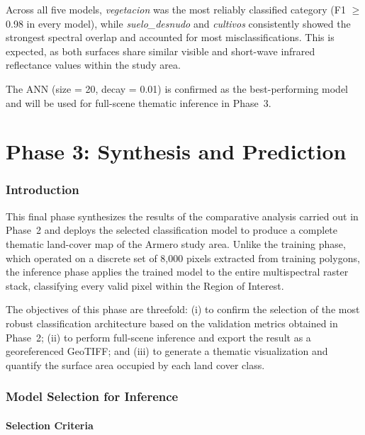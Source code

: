 \documentclass[12pt,a4paper]{article}
\begin{document}
Across all five models, \textit{vegetacion} was the most reliably classified category (F1 $\geq$ 0.98 in every model), while \textit{suelo\_desnudo} and \textit{cultivos} consistently showed the strongest spectral overlap and accounted for most misclassifications. This is expected, as both surfaces share similar visible and short-wave infrared reflectance values within the study area.

The ANN (size = 20, decay = 0.01) is confirmed as the best-performing model and will be used for full-scene thematic inference in Phase~3.

\part{Phase 3: Synthesis and Prediction}

\section{Introduction}

This final phase synthesizes the results of the comparative analysis carried out in Phase~2 and deploys the selected classification model to produce a complete thematic land-cover map of the Armero study area. Unlike the training phase, which operated on a discrete set of 8,000 pixels extracted from training polygons, the inference phase applies the trained model to the entire multispectral raster stack, classifying every valid pixel within the Region of Interest.

The objectives of this phase are threefold: (i) to confirm the selection of the most robust classification architecture based on the validation metrics obtained in Phase~2; (ii) to perform full-scene inference and export the result as a georeferenced GeoTIFF; and (iii) to generate a thematic visualization and quantify the surface area occupied by each land cover class.

\section{Model Selection for Inference}

\subsection{Selection Criteria}
\end{document}
